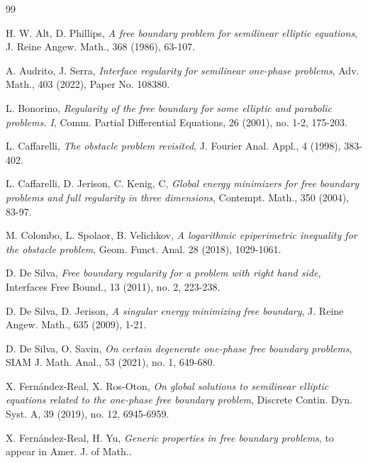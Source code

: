 \documentclass{amsart}
\theoremstyle{definition}
\numberwithin{equation}{section}
\theoremstyle{remark}
\begin{document}
\begin{thebibliography}{99}


 H. W. Alt, D. Phillips, \emph{A free boundary problem for semilinear elliptic equations}, {J. Reine Angew. Math.}, 368 (1986), 63-107.

 A. Audrito, J. Serra, \emph{Interface regularity for semilinear one-phase problems}, {Adv. Math.}, 403 (2022), Paper No. 108380.


 L. Bonorino, \emph{Regularity of the free boundary for some elliptic and parabolic problems. I}, {Comm. Partial Differential Equations}, 26 (2001), no. 1-2, 175-203.



 L. Caffarelli, \emph{The obstacle problem revisited}, {J. Fourier Anal. Appl.}, 4 (1998), 383-402.


 L. Caffarelli, D. Jerison, C. Kenig, C, \emph{Global energy minimizers for free boundary problems and full regularity in three dimensions}, Contempt. Math., 350 (2004), 83-97.

 M. Colombo, L. Spolaor, B. Velichkov, {\em A logarithmic epiperimetric inequality for the obstacle problem}, Geom. Funct. Anal. 28 (2018), 1029-1061.



 D. De Silva, \emph{Free boundary regularity for a problem with right hand side}, Interfaces Free Bound., 13 (2011), no. 2, 223-238.


 D. De Silva, D. Jerison, \emph{A singular energy minimizing free boundary}, {J. Reine Angew. Math.}, 635 (2009), 1-21.

 D. De Silva, O. Savin, \emph{On certain degenerate one-phase free boundary problems}, {SIAM J. Math. Anal.}, 53 (2021), no. 1, 649-680.


 X. Fern\'andez-Real, X. Ros-Oton, \emph{On global solutions to semilinear elliptic equations related to the one-phase free boundary problem}, {Discrete Contin. Dyn. Syst. A}, 39 (2019), no. 12, 6945-6959.

 X. Fern\'andez-Real, H. Yu, \emph{Generic properties in free boundary problems}, {to appear in Amer. J. of Math.}.


\end{thebibliography}
\end{document}
